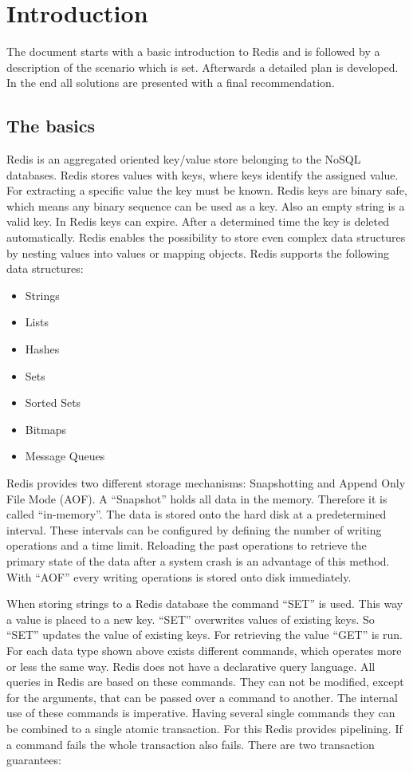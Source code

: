 \chapter{Introduction}

The document starts with a basic introduction to Redis and is followed by a description of the scenario which is set. Afterwards a detailed plan is developed. In the end all solutions are presented with a final recommendation.

\section{The basics}
Redis is an aggregated oriented key/value store belonging to the NoSQL databases. Redis stores values with keys, where keys identify the assigned value. For extracting a specific value the key must be known. Redis keys are binary safe, which means any binary sequence can be used as a key. Also an empty string is a valid key. In Redis keys can expire. After a determined time the key is deleted automatically. Redis enables the possibility to store even complex data structures by nesting values into values or mapping objects. Redis supports the following data structures:

\begin{itemize} 
	\item Strings
	\item Lists
	\item Hashes
	\item Sets
	\item Sorted Sets
\item 	Bitmaps
	\item Message Queues
\end{itemize}

Redis provides two different storage mechanisms: Snapshotting and Append Only File Mode (AOF). A “Snapshot” holds all data in the memory. Therefore it is called “in-memory”. The data is stored onto the hard disk at a predetermined interval. These intervals can be configured by defining the number of writing operations and a time limit. Reloading the past operations to retrieve the primary state of the data after a system crash is an advantage of this method. With “AOF” every writing operations is stored onto disk immediately.

When storing strings to a Redis database the command “SET” is used. This way a value is placed to a new key. “SET” overwrites values of existing keys. So “SET” updates the value of existing keys. For retrieving the value “GET” is run. For each data type shown above exists different commands, which operates more or less the same way. Redis does not have a declarative query language. All queries in Redis are based on these commands. They can not be modified, except for the arguments, that can be passed over a command to another. The internal use of these commands is imperative. Having several single commands they can be combined to a single atomic transaction. For this Redis provides pipelining. If a command fails the whole transaction also fails. There are two transaction guarantees: